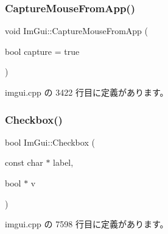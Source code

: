 \subsubsection{\texorpdfstring{Capture\+Mouse\+From\+App()}{CaptureMouseFromApp()}}
{\footnotesize\ttfamily void Im\+Gui\+::\+Capture\+Mouse\+From\+App (\begin{DoxyParamCaption}\item[{bool}]{capture = {\ttfamily true} }\end{DoxyParamCaption})}



 imgui.\+cpp の 3422 行目に定義があります。

\mbox{\label{namespace_im_gui_a57d73c1d0ef807fef734d91024092027}} 
\subsubsection{\texorpdfstring{Checkbox()}{Checkbox()}}
{\footnotesize\ttfamily bool Im\+Gui\+::\+Checkbox (\begin{DoxyParamCaption}\item[{const char $\ast$}]{label,  }\item[{bool $\ast$}]{v }\end{DoxyParamCaption})}



 imgui.\+cpp の 7598 行目に定義があります。

